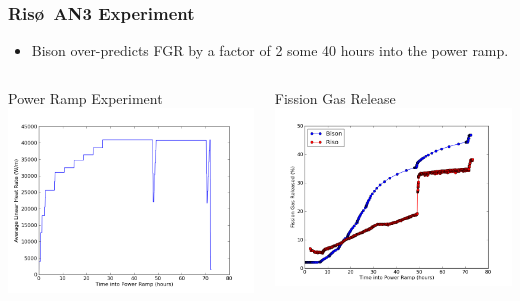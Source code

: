\begin{frame}
\frametitle{Ris\o~AN3 Experiment}

\begin{itemize}
  \item Bison over-predicts FGR by a factor of 2 some 40 hours into the power ramp.
\end{itemize}

\begin{columns}
 \begin{column}{0.5\textwidth}
  \centering
  Power Ramp Experiment
  \includegraphics[width=1.\textwidth]{./power_ramp.png}
 \end{column}
 \begin{column}{0.5\textwidth}
  \centering
  Fission Gas Release
  \includegraphics[width=1.\textwidth]{./fgr_comparison.png}
 \end{column}
\end{columns}

\end{frame}
